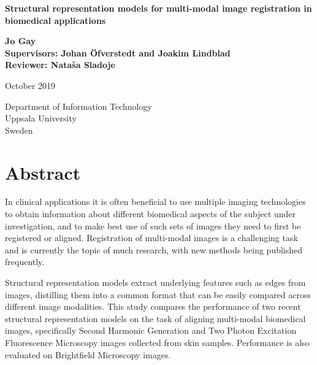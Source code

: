 \documentclass{report}
\begin{document}
\begin{titlepage}
   \begin{center}
       \vspace*{1cm}
 
    \Huge
       \textbf{Structural representation models for multi-modal image registration in biomedical applications}

       \vspace{1.5cm}
       
    \Large
       \textbf{Jo Gay\\[1cm]{Supervisors: Johan Öfverstedt and Joakim Lindblad \\Reviewer: Nata\v sa Sladoje}}
       
    \vspace{0.5cm}
    October 2019
  
    \vspace{0.8cm}
 
 
    Department of Information Technology\\
    Uppsala University\\
    Sweden\\


   \end{center}
\end{titlepage}

\chapter*{Abstract}
In clinical applications it is often beneficial to use multiple imaging technologies to obtain information about different biomedical aspects of the subject under investigation, and to make best use of such sets of images they need to first be registered or aligned. Registration of multi-modal images is a challenging task and is currently the topic of much research, with new methods being published frequently.

Structural representation models extract underlying features such as edges from images, distilling them into a common format that can be easily compared across different image modalities. This study compares the performance of two recent structural representation models on the task of aligning multi-modal biomedical images, specifically Second Harmonic Generation and Two Photon Excitation Fluorescence Microscopy images collected from skin samples. Performance is also evaluated on Brightfield Microscopy images.
\end{document}
